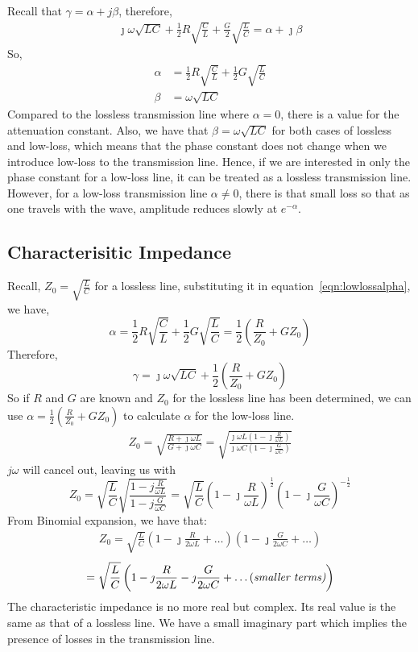 Recall that $\gamma = \alpha + j\beta$, therefore,
\begin{align*}
\jmath\omega\sqrt{LC} + \frac{1}{2}R\sqrt{\frac{C}{L}} + \frac{G}{2}\sqrt{\frac{L}{C}} = \alpha + \jmath\beta
\end{align*}
So,
\begin{align}
\alpha &= \frac{1}{2}R\sqrt{\frac{C}{L}} + \frac{1}{2}G\sqrt{\frac{L}{C}}\label{eqn:lowlossalpha}\\
\beta &= \omega\sqrt{LC}
\end{align}
Compared to the lossless transmission line where $\alpha = 0$, there is a value for the attenuation constant. Also, we have that $\beta = \omega\sqrt{LC}$ for both cases of lossless and low-loss, which means that the phase constant does not change when we introduce low-loss to the transmission line. Hence, if we are interested in only the phase constant for a low-loss line, it can be treated as a lossless transmission line. However, for a low-loss transmission line $\alpha \neq 0$, there is that small loss so that as one travels with the wave, amplitude reduces slowly at $e^{-\alpha}$.

\subsection{Characterisitic Impedance}
Recall, $Z_0 = \sqrt{\frac{L}{C}}$ for a lossless line, substituting it in equation~\eqref{eqn:lowlossalpha}, we have,
\[\alpha = \frac{1}{2}R\sqrt{\frac{C}{L}} + \frac{1}{2}G\sqrt{\frac{L}{C}} = \frac{1}{2}\left(\frac{R}{Z_0} + GZ_0\right)\]
Therefore,
\[\gamma = \jmath\omega\sqrt{LC} + \frac{1}{2}\left(\frac{R}{Z_0} + GZ_0\right)\]
So if $R$ and $G$ are known and $Z_0$ for the lossless line has been determined, we can use $\alpha = \frac{1}{2}(\frac{R}{Z_0} + GZ_0)$ to calculate $\alpha$ for the low-loss line.
\begin{align*}
Z_0 = \sqrt{\frac{R + \jmath\omega L}{G + \jmath\omega C}} = \sqrt{\frac{\jmath\omega L(1 - \jmath\frac{R}{\omega L})}{\jmath\omega C(1 - \jmath\frac{G}{\omega C})}}
\end{align*}
$j\omega$ will cancel out, leaving us with
\begin{dmath*}
Z_0 = \sqrt{\frac{L}{C}}\sqrt{\frac{1 - j\frac{R}{\omega L}}{1 - j\frac{G}{\omega C}}} =\sqrt{\frac{L}{C}}\left(1 - \jmath\frac{R}{\omega L}\right)^{\frac{1}{2}}\left(1 - \jmath\frac{G}{\omega C}\right)^{-\frac{1}{2}} 
\end{dmath*}
From Binomial expansion, we have that:
\begin{align*}
Z_0 = \sqrt{\frac{L}{C}}\left(1 - \jmath\frac{R}{2\omega L} + \ldots\right)\left(1 - \jmath\frac{G}{2\omega C} + \ldots\right)
\end{align*}
\begin{align*}
= \sqrt{\frac{L}{C}}\left(1 - \jmath\frac{R}{2\omega L} - \jmath\frac{G}{2\omega C} + \text{\ldots (\it{smaller terms})}\right)
\end{align*}
The characteristic impedance is no more real but complex. Its real value is the same as that of a lossless line. We have a small imaginary part which implies the presence of losses in the transmission line.

